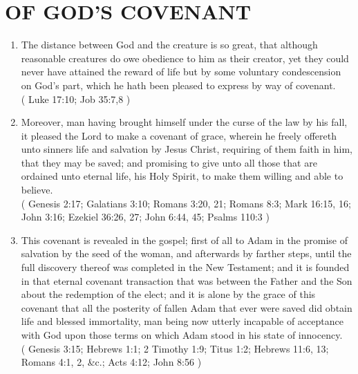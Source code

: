 \documentclass[12pt,a4paper]{book}
\begin{document}
\chapter{OF GOD'S COVENANT}
\label{ch-God-cov}
\begin{enumerate}
\item
\label{ch-God-cov-1}
The distance between God and the creature is so great, that although reasonable creatures do owe obedience to him as their creator, yet they could never have attained the reward of life but by some voluntary condescension on God's part, which he hath been pleased to express by way of covenant.\\
( Luke 17:10; Job 35:7,8 )
\item
\label{ch-God-cov-2}
Moreover, man having brought himself under the curse of the law by his fall, it pleased the Lord to make a covenant of grace, wherein he freely offereth unto sinners life and salvation by Jesus Christ, requiring of them faith in him, that they may be saved; and promising to give unto all those that are ordained unto eternal life, his Holy Spirit, to make them willing and able to believe.\\
( Genesis 2:17; Galatians 3:10; Romans 3:20, 21; Romans 8:3; Mark 16:15, 16; John 3:16; Ezekiel 36:26, 27; John 6:44, 45; Psalms 110:3 )
\item
\label{ch-God-cov-3}
This covenant is revealed in the gospel; first of all to Adam in the promise of salvation by the seed of the woman, and afterwards by farther steps, until the full discovery thereof was completed in the New Testament; and it is founded in that eternal covenant transaction that was between the Father and the Son about the redemption of the elect; and it is alone by the grace of this covenant that all the posterity of fallen Adam that ever were saved did obtain life and blessed immortality, man being now utterly incapable of acceptance with God upon those terms on which Adam stood in his state of innocency.\\
( Genesis 3:15; Hebrews 1:1; 2 Timothy 1:9; Titus 1:2; Hebrews 11:6, 13; Romans 4:1, 2, \&c.; Acts 4:12; John 8:56 )
\end{enumerate}
\end{document}
